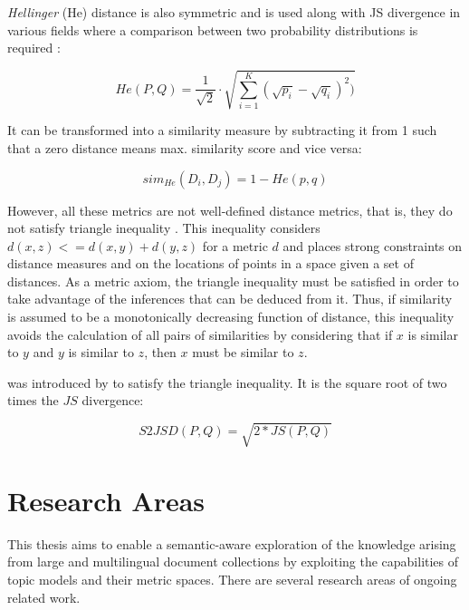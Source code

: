 \textit{Hellinger} (He) distance is also symmetric and is used along with JS divergence in various fields where a comparison between two probability distributions is required \citep{Blei2007a,Hall2008,Boyd-Graber2010}:

\begin{equation}
	He(P, Q) = \frac{1}{\sqrt{2}}\cdot\sqrt{\sum\limits_{i=1}^K (\sqrt{p_i} - \sqrt{q_i})^2)}
	\label{eq:hedistance}
\end{equation}

It can be transformed into a similarity measure by subtracting it from 1 \citep{Rus2013} such that a zero distance means max. similarity score and vice versa:

\begin{equation}
	sim_{He}(D_i, D_j) = 1 - He(p,q)
	\label{eq:simhe}
\end{equation}

However, all these metrics are not well-defined distance metrics, that is, they do not satisfy triangle inequality \citep{Charikar2002}. This inequality considers $d(x, z) <= d(x, y) + d(y, z)$ for a metric $d$ \citep{Griffiths2007} and places strong constraints on distance measures and on the locations of points in a space given a set of distances. As a metric axiom, the triangle inequality must be satisfied in order to take advantage of the inferences that can be deduced from it. Thus, if similarity is assumed to be a monotonically decreasing function of distance, this inequality avoids the calculation of all pairs of similarities by considering that if $x$ is similar to $y$ and $y$ is similar to $z$, then $x$ must be similar to $z$. 

 was introduced by \citep{Endres2003} to satisfy the triangle inequality. It is the square root of two times the $JS$ divergence:

\begin{equation}
    S2JSD(P,Q) = \sqrt{2*JS(P,Q)}
\label{eq:s2jsd}
\end{equation}

\section{Research Areas}
\label{sec:research-topic}

This thesis aims to enable a semantic-aware exploration of the knowledge arising from large and multilingual document collections by exploiting the capabilities of topic models and their metric spaces. There are several research areas of ongoing related work. 

